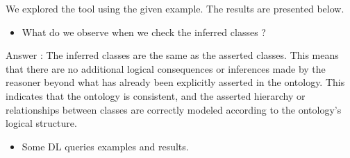 
We explored the tool using the given example. The results are presented below.
\\

\smallskip
\begin{itemize}
    \item What do we observe when we check the inferred classes ?
\end{itemize}
\smallskip
Answer :    The inferred classes are the same as the asserted classes. This means that there are no additional logical consequences or inferences made by the reasoner beyond what has already been explicitly asserted in the ontology. This indicates that the ontology is consistent, and the asserted hierarchy or relationships between classes are correctly modeled according to the ontology's logical structure.

\begin{itemize}
    \item Some DL queries examples and results.
\end{itemize}

